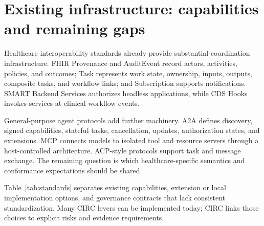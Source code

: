 \documentclass[10pt]{article}
\begin{document}
\section{Existing infrastructure: capabilities and remaining gaps}

Healthcare interoperability standards already provide substantial coordination infrastructure.
FHIR Provenance and AuditEvent record actors, activities, policies, and outcomes; Task represents
work state, ownership, inputs, outputs, composite tasks, and workflow links; and Subscription supports
notifications. SMART Backend Services authorizes headless applications, while CDS Hooks invokes
services at clinical workflow events.\cite{hl7v251,hl7fhir2019,mandel2016smart,hl7cdshooks2018,
hl7smart2024}

General-purpose agent protocols add further machinery. A2A defines discovery, signed capabilities,
stateful tasks, cancellation, updates, authorization states, and extensions.\cite{googlea2a2025,
a2aspec2026} MCP connects models to isolated tool and resource servers through a host-controlled
architecture.\cite{anthropicmcp2024,mcpspec2025} ACP-style protocols support task and message
exchange.\cite{ibmacp2025} The remaining question is which healthcare-specific semantics and
conformance expectations should be shared.

Table~\ref{tab:standards} separates existing capabilities, extension or local implementation
options, and governance contracts that lack consistent standardization. Many CIRC levers can be
implemented today; CIRC links those choices to explicit risks and evidence requirements.
\end{document}
